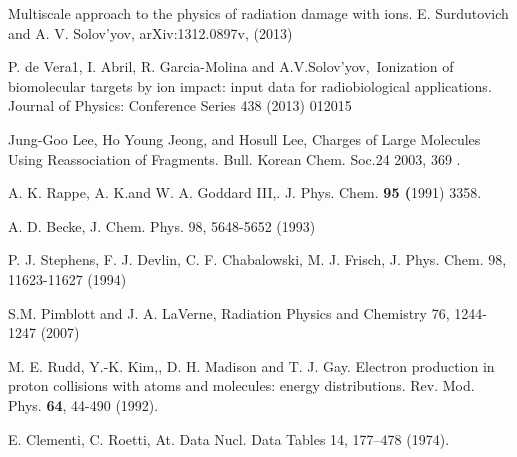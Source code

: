 \documentclass[preprint,12pt]{article}
\begin{document}
\begin{thebibliography}{99}
Multiscale approach to the physics of radiation
damage with ions. E. Surdutovich and A. V. Solov'yov, 
arXiv:1312.0897v, (2013)

P. de Vera1, I. Abril, R. Garcia-Molina and
A.V.Solov'yov,\ Ionization of biomolecular targets by ion impact: input data
for radiobiological applications. 
Journal of Physics: Conference Series 438
(2013) 012015

Jung-Goo Lee, Ho Young Jeong, and Hosull Lee, Charges of
Large Molecules Using Reassociation of Fragments. 
Bull. Korean Chem. Soc.24 2003, 369 .

A. K. Rappe, A. K.and W. A. Goddard III,. 
J. Phys. Chem. \textbf{95 (}1991) 3358.

A. D. Becke, 
J. Chem. Phys. 98, 5648-5652 (1993) 

P. J. Stephens, F. J. Devlin, C. F. Chabalowski, M. J. Frisch,
J. Phys. Chem. 98, 11623-11627 (1994) 

S.M. Pimblott and J. A. LaVerne, Radiation
Physics and Chemistry 76, 1244-1247 (2007)

M. E. Rudd, Y.-K. Kim,, D. H. Madison and T. J. Gay.
Electron production in proton collisions with atoms and molecules: energy
distributions. 
Rev. Mod. Phys. \textbf{64}, 44-490 (1992).

E. Clementi, C. Roetti,
At. Data Nucl. Data Tables 14, 177--478 (1974).


\end{thebibliography}
\end{document}
